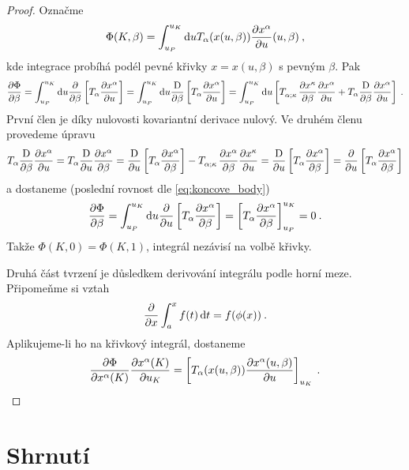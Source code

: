 \documentclass{article}
\begin{document}
\begin{proof}
    Označme
    \begin{align}
        \Phi(K,\beta) = \int_{u_P}^{u_K} \mathrm{d} u T_\alpha(x(u,\beta)) \frac{\partial x^\alpha}{\partial u} (u,\beta) \:,
    \end{align}
    kde integrace probíhá podél pevné křivky $x=x(u,\beta)$ s pevným $\beta$. Pak
    \begin{align}
        \pder{\Phi}{\beta} 
        = \int_{u_P}^{u_K} \D u \pder{}{\beta} \left[ T_\alpha \pder{x^\alpha}{u} \right] 
        = \int_{u_P}^{u_K} \D u \apder{}{\beta} \left[ T_\alpha \pder{x^\alpha}{u} \right]
        = \int_{u_P}^{u_K} \D u \left[ T\indices{_\alpha_;_\kappa}\pder{x^\kappa}{\beta} \pder{x^\alpha}{u} + T_\alpha \apder{}{\beta} \pder{x^\alpha}{u} \right] \:.
    \end{align}
    První člen je díky nulovosti kovariantní derivace nulový. Ve druhém členu provedeme úpravu
    \begin{align}
        T_\alpha \apder{}{\beta} \pder{x^\alpha}{u} 
        =T_\alpha \apder{}{u} \pder{x^\alpha}{\beta}
        = \apder{}{u} \left[ T_\alpha \pder{x^\alpha}{\beta} \right] - T\indices{_\alpha_;_\kappa} \pder{x^\alpha}{\beta} \pder{x^\kappa}{u}
        = \apder{}{u} \left[ T_\alpha \pder{x^\alpha}{\beta} \right] 
        = \pder{}{u} \left[ T_\alpha \pder{x^\alpha}{\beta} \right]
    \end{align}
    a dostaneme (poslední rovnost dle \eqref{eq:koncove_body})
    \begin{align}
        \frac{\partial \Phi}{\partial \beta} 
        = \int_{u_P}^{u_K} \mathrm{d} u \frac{\partial }{\partial u} \left[ T_\alpha \frac{\partial x^\alpha}{\partial \beta} \right] = \left[ T_\alpha \frac{\partial x^\alpha}{\partial \beta} \right]_{u_P}^{u_K} = 0 \:.
    \end{align}
    Takže $\Phi(K,0) = \Phi(K,1)$, integrál nezávisí na volbě křivky.

    Druhá část tvrzení je důsledkem derivování integrálu podle horní meze. Připomeňme si vztah
    \begin{align}
        \frac{\partial }{\partial x} \int_a^{x} f(t) \, \mathrm{d} t = f(\phi(x)) \:.
    \end{align} 
    Aplikujeme-li ho na křivkový integrál, dostaneme
    \begin{align}
        \frac{\partial \Phi}{\partial x^\alpha(K)} \frac{\partial x^\alpha(K)}{\partial u_K} = \left[ T_\alpha (x(u,\beta)) \frac{\partial x^\alpha(u,\beta)}{\partial u} \right]_{u_K} \:.
    \end{align}
\end{proof}

\section*{Shrnutí}
\end{document}
